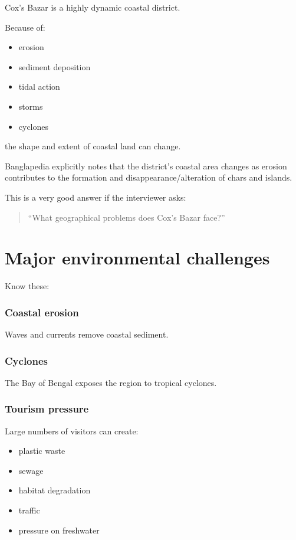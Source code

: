 Cox's Bazar is a highly dynamic coastal district.

Because of:

\begin{itemize}
  \item erosion
  \item sediment deposition
  \item tidal action
  \item storms
  \item cyclones
\end{itemize}

the shape and extent of coastal land can change.

Banglapedia explicitly notes that the district's coastal area changes as erosion contributes to the formation and disappearance/alteration of chars and islands.

This is a very good answer if the interviewer asks:

\begin{quote}
``What geographical problems does Cox's Bazar face?''\\
\end{quote}

\medskip

\section{Major environmental challenges}

Know these:

\subsubsection{Coastal erosion}

Waves and currents remove coastal sediment.

\subsubsection{Cyclones}

The Bay of Bengal exposes the region to tropical cyclones.

\subsubsection{Tourism pressure}

Large numbers of visitors can create:

\begin{itemize}
  \item plastic waste
  \item sewage
  \item habitat degradation
  \item traffic
  \item pressure on freshwater
\end{itemize}

